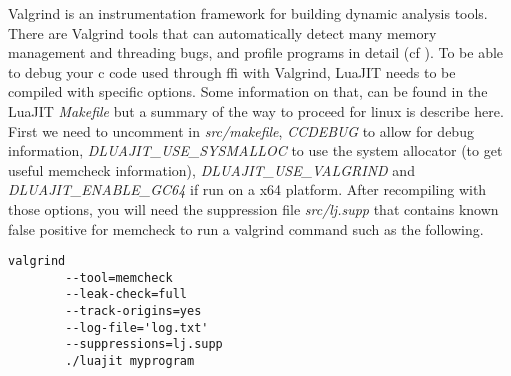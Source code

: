 
Valgrind is an instrumentation framework for building dynamic analysis tools.
There are Valgrind tools that can automatically detect many memory management
and threading bugs, and profile programs in detail (cf \cite{valgrind}). To be
able to debug your c code used through ffi with Valgrind, LuaJIT needs to be
compiled with specific options. Some information on that, can be found in the
LuaJIT \emph{Makefile} but a summary of the way to proceed for linux is describe
here. First we need to uncomment in \emph{src/makefile}, \emph{CCDEBUG} to
allow for debug information, \emph{DLUAJIT\_USE\_SYSMALLOC} to use the system
allocator (to get useful memcheck information), \emph{DLUAJIT\_USE\_VALGRIND}
and \emph{DLUAJIT\_ENABLE\_GC64} if run on a x64 platform. After recompiling
with those options, you will need the suppression file \emph{src/lj.supp} that
contains known false positive for memcheck to run a valgrind command such as the
following.

\begin{lstlisting}[style=CStyle]
valgrind
		--tool=memcheck
		--leak-check=full
		--track-origins=yes
		--log-file='log.txt'
		--suppressions=lj.supp
		./luajit myprogram
\end{lstlisting}


